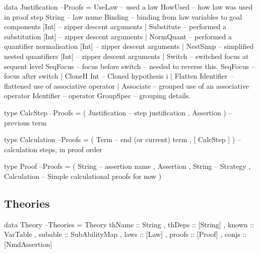 \begin{code}
data Justification                                                    --Proofs
  = UseLaw             -- used a law
      HowUsed              -- how law was used in proof step
      String               -- law name
      Binding              -- binding from law variables to goal components
      [Int]                -- zipper descent arguments
  | Substitute         -- performed a substitution
      [Int]                -- zipper descent arguments
  | NormQuant          -- performed a quantifier normalisation
      [Int]                -- zipper descent arguments
  | NestSimp           -- simplified nested quantifiers
      [Int]                -- zipper descent arguments
  | Switch             -- switched focus at sequent level
      SeqFocus             -- focus before switch -- needed to reverse this.
      SeqFocus             -- focus after switch
  | CloneH Int         --  Cloned hypothesis i
  | Flatten Identifier -- flattened use of associative operator
  | Associate          -- grouped use of an associative operator
      Identifier           -- operator
      GroupSpec            -- grouping details.
\end{code}

\begin{code}
type CalcStep                                                         --Proofs
  = ( Justification  -- step justification
    , Assertion )         -- previous term
\end{code}

\begin{code}
type Calculation                                                      --Proofs
  = ( Term -- end (or current) term
    , [ CalcStep ] )  -- calculation steps, in proof order
\end{code}

\begin{code}
type Proof                                                            --Proofs
  = ( String -- assertion name
    , Assertion
    , String -- Strategy
    , Calculation -- Simple calculational proofs for now
    )
\end{code}


\subsection{Theories}

\begin{code}
data Theory                                                         --Theories
  = Theory {
      thName   :: String
    , thDeps   :: [String]
    , known    :: VarTable
    , subable  :: SubAbilityMap
    , laws     :: [Law]
    , proofs   :: [Proof]
    , conjs    :: [NmdAssertion]
    }
\end{code}

